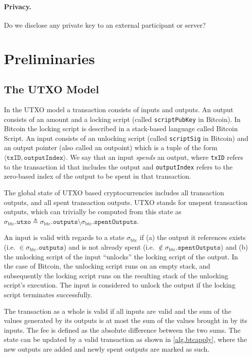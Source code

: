 \documentclass[sigconf,authordraft]{acmart}
\providecommand{\tpl}[1]{\ensuremath{\langle#1\rangle}}
\begin{document}
\paragraph{Privacy.} Do we disclose any private key to an external participant or server?

\section{Preliminaries}
\subsection{The UTXO Model}
In the UTXO model a transaction consists of inputs and outputs. An output consists of an amount and a locking script (called \texttt{scriptPubKey} in Bitcoin). In Bitcoin the locking script is described in a stack-based language called Bitcoin Script. An input consists of an unlocking script (called \texttt{scriptSig} in Bitcoin) and an output pointer (also called an outpoint) which is a tuple of the form \tpl{\texttt{txID}, \texttt{outputIndex}}. We say that an input \emph{spends} an output, where \texttt{txID} refers to the transaction id that includes the output and \texttt{outputIndex} refers to the zero-based index of the output to be spent in that transaction.

\def\btcstate{\ensuremath{\sigma_\text{btc}}}
\def\btcapply{\text{apply}\textsubscript{btc}}
\def\outputs{\texttt{outputs}}
\def\inputs{\texttt{inputs}}
\def\spentOutputs{\texttt{spentOutputs}}
\def\utxo{\texttt{utxo}}
The global state of UTXO based cryptocurrencies includes all transaction outputs, and all spent transaction outputs. UTXO stands for unspent transaction outputs, which can trivially be computed from this state as $\btcstate.\utxo \triangleq \btcstate.\outputs \setminus \btcstate.\spentOutputs$.

An input is valid with regards to a state $\btcstate$ if (a) the output it references exists (i.e. $\in \btcstate.\outputs$) and is not already spent (i.e. $\notin \btcstate.\spentOutputs$) and (b) the unlocking script of the input ``unlocks'' the locking script of the output. In the case of Bitcoin, the unlocking script runs on an empty stack, and subsequently the locking script runs on the resulting stack of the unlocking script's execution. The input is considered to unlock the output if the locking script terminates successfully.

The transaction as a whole is valid if all inputs are valid and the sum of the values generated by its outputs is at most the sum of the values brought in by its inputs. The fee is defined as the absolute difference between the two sums. The state can be updated by a valid transaction as shown in \cref{alg.btcapply}, where the new outputs are added and newly spent outputs are marked as such.
\end{document}
